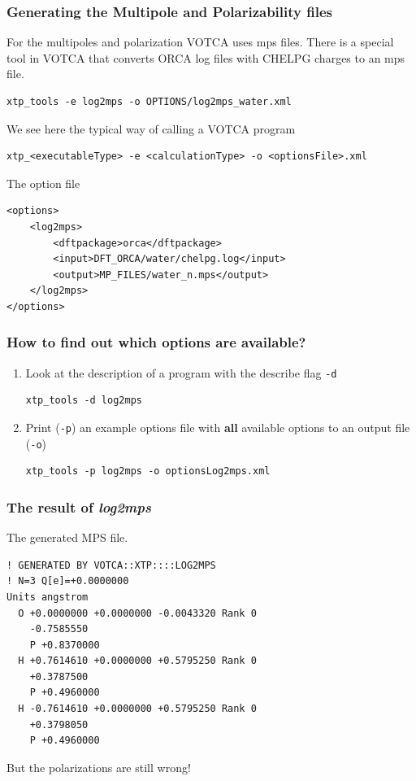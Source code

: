 \documentclass[t,aspectratio=169, 8pt]{beamer}
\begin{document}
\begin{frame}[fragile]
  \frametitle{Generating the Multipole and Polarizability files}
  For the multipoles and polarization VOTCA uses mps files. There is a special tool in VOTCA that converts ORCA log files with CHELPG charges to an mps file.
  \begin{verbatim}
xtp_tools -e log2mps -o OPTIONS/log2mps_water.xml
  \end{verbatim}
  We see here the typical way of calling a VOTCA program
  \begin{verbatim}
xtp_<executableType> -e <calculationType> -o <optionsFile>.xml
  \end{verbatim}
  The option file
  \begin{verbatim}
<options>
    <log2mps>
        <dftpackage>orca</dftpackage>
        <input>DFT_ORCA/water/chelpg.log</input>
        <output>MP_FILES/water_n.mps</output>
    </log2mps>
</options>
  \end{verbatim}
\end{frame}

\begin{frame}[fragile]
  \frametitle{How to find out which options are available?}
  \begin{enumerate}
    \item Look at the description of a program with the describe flag \texttt{-d}\\
          \begin{verbatim}
xtp_tools -d log2mps
    \end{verbatim}
    \item Print (\texttt{-p}) an example options file with \textbf{all} available options to an output file (\texttt{-o})
          \begin{verbatim}
xtp_tools -p log2mps -o optionsLog2mps.xml
    \end{verbatim}
  \end{enumerate}
\end{frame}


\begin{frame}[fragile]
  \frametitle{The result of \textit{log2mps}}
  The generated MPS file.
  \begin{verbatim}
! GENERATED BY VOTCA::XTP::::LOG2MPS 
! N=3 Q[e]=+0.0000000
Units angstrom
  O +0.0000000 +0.0000000 -0.0043320 Rank 0
    -0.7585550
    P +0.8370000
  H +0.7614610 +0.0000000 +0.5795250 Rank 0
    +0.3787500
    P +0.4960000
  H -0.7614610 +0.0000000 +0.5795250 Rank 0
    +0.3798050
    P +0.4960000
  \end{verbatim}
  But the polarizations are still wrong!
\end{frame}
\end{document}
